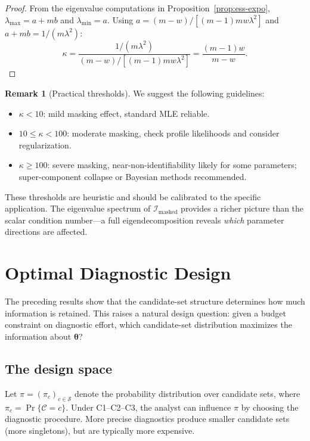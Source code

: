 \documentclass[11pt]{article}
\theoremstyle{definition}
\newtheorem{remark}{Remark}
\theoremstyle{plain}
\renewcommand{\v}[1]{\boldsymbol{#1}}
\newcommand{\btheta}{\v{\theta}}
\newcommand{\FI}{\mathcal{I}}       %
\begin{document}
\begin{proof}
From the eigenvalue computations in Proposition~\ref{prop:ess-expo},
$\lambda_{\max} = a + mb$ and $\lambda_{\min} = a$.
Using $a = (m-w)/[(m-1)mw\lambda^2]$ and
$a + mb = 1/(m\lambda^2)$:
\begin{equation}
    \kappa = \frac{1/(m\lambda^2)}{(m-w)/[(m-1)mw\lambda^2]}
    = \frac{(m-1)w}{m-w}.
\end{equation}
\end{proof}

\begin{remark}[Practical thresholds]
\label{rem:thresholds}
We suggest the following guidelines:
\begin{itemize}[nosep]
    \item $\kappa < 10$: mild masking effect, standard MLE reliable.
    \item $10 \leq \kappa < 100$: moderate masking, check profile
    likelihoods and consider regularization.
    \item $\kappa \geq 100$: severe masking, near-non-identifiability
    likely for some parameters; super-component collapse or Bayesian
    methods recommended.
\end{itemize}
These thresholds are heuristic and should be calibrated to the
specific application.
The eigenvalue spectrum of $\FI_{\mathrm{masked}}$ provides a richer
picture than the scalar condition number---a full eigendecomposition
reveals \emph{which} parameter directions are affected.
\end{remark}


\section{Optimal Diagnostic Design}
\label{sec:design}

The preceding results show that the candidate-set structure determines
how much information is retained.
This raises a natural design question: given a budget constraint on
diagnostic effort, which candidate-set distribution maximizes the
information about $\btheta$?

\subsection{The design space}

Let $\pi = (\pi_c)_{c \in \mathcal{S}}$ denote the probability
distribution over candidate sets, where $\pi_c = \Pr\{\mathcal{C} = c\}$.
Under C1--C2--C3, the analyst can influence $\pi$ by choosing the
diagnostic procedure.
More precise diagnostics produce smaller candidate sets
(more singletons), but are typically more expensive.
\end{document}
